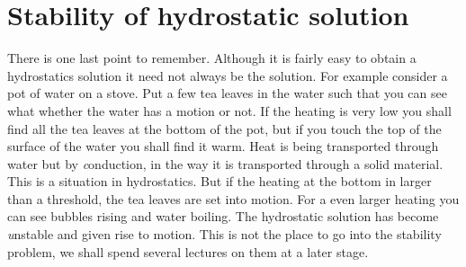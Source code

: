 \section{Stability of hydrostatic solution}
There is one last point to remember. Although it is fairly easy to
obtain a hydrostatics solution it need not always be the solution. For
example consider a pot of water on a stove. Put a few tea leaves in
the water such that you can see what whether the water has a motion or
not. If the heating is very low you shall find all the tea leaves at
the bottom of the pot, but if you touch the top of the surface of the
water you shall find it warm. Heat is being transported through water
but by {\textit conduction}, in the way it is transported through a
solid material. This is a situation in hydrostatics. But if the
heating at the bottom in larger than a threshold, the tea leaves are
set into motion. For a even larger heating you can see bubbles rising
and water boiling. The hydrostatic solution has become {\textit
  unstable} and given rise to motion. This is not the place to go into
the stability problem, we shall spend several lectures on them at a
later stage. 
\newpage

